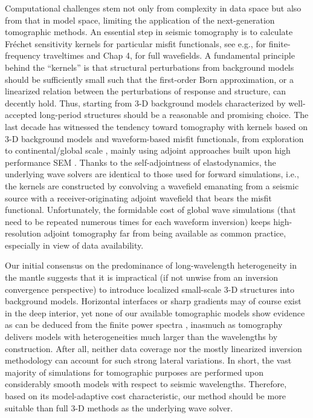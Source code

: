 \documentclass[extra]{gji}
\begin{document}
Computational challenges stem not only from complexity in data space 
but also from that in model space, limiting the application 
of the next-generation tomographic methods.
An essential step in seismic tomography is to calculate  
Fr\'{e}chet sensitivity kernels
for particular misfit functionals, see e.g., \cite{dahlen2000frechet}
for finite-frequency traveltimes and Chap 4, \cite{nolet2008breviary}
for full wavefields. 
A fundamental principle behind the ``kernels'' is that 
structural perturbations from background models
should be sufficiently small such that the first-order
Born approximation, or a linearized relation between the perturbations of 
response and structure, can decently hold. 
Thus, starting from 3-D background models characterized by well-accepted 
long-period structures should be a reasonable and promising choice.
The last decade has witnessed the tendency toward  
tomography with kernels based on 3-D background models and waveform-based misfit
functionals, from exploration 
\cite[e.g.,][]{plessix2006review, luo2009seismic}
to continental/global scale
\cite[e.g.,][]{liu2008finite, tape2009adjoint, fichtner2008theoretical, colombi2014seismic}, 
mainly using adjoint approaches \cite[]{tarantola1988theoretical,
tromp2005seismic} built upon high performance 
SEM \cite[]{komatitsch2002spectralI, peter2011forward}.
Thanks to the self-adjointness of elastodynamics, the underlying wave solvers are
identical to those used for forward simulations, i.e., the kernels are 
constructed by convolving a wavefield emanating from a seismic source with a
receiver-originating adjoint wavefield that bears the misfit functional.
Unfortunately, the formidable cost of global wave simulations
(that need to be repeated numerous times for each waveform inversion) 
keeps high-resolution adjoint tomography far from being 
available as common practice, especially in view of data availability.

Our initial consensus on the predominance of long-wavelength 
heterogeneity in the mantle \cite[]{su1991predominance} suggests that
it is impractical (if not unwise from an inversion convergence
perspective) to introduce localized small-scale 3-D structures
into background models. 
Horizontal interfaces or sharp gradients may of course exist in the deep interior, 
yet none of our available tomographic models show evidence as can be 
deduced from the finite power spectra \cite[]{becker2002comparison},
inasmuch as tomography delivers models with heterogeneities much larger than the
wavelengths by construction.
After all, neither data coverage nor the mostly linearized inversion 
methodology can account for such strong lateral variations.
In short, the vast majority of simulations for tomographic purposes are
performed upon considerably smooth models with respect to seismic 
wavelengths. Therefore, based on its model-adaptive cost characteristic, 
our method should be more suitable than full 3-D methods 
as the underlying wave solver.   
\end{document}
